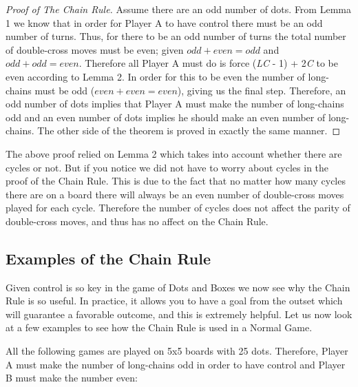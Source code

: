 \documentclass[12pt,twoside]{reedthesis}
\begin{document}
\begin{proof}[Proof of The Chain Rule]
Assume there are an odd number of dots.  From Lemma 1 we know that in order for Player A to have control there must be an odd number of turns.  Thus, for there to be an odd number of turns the total number of double-cross moves must be even; given $odd + even = odd$ and $odd + odd = even$.  Therefore all Player A must do is force  (\emph{LC} - 1) + 2\emph{C} to be even according to Lemma 2.  In order for this to be even the number of long-chains must be odd ($even + even = even$), giving us the final step.  Therefore, an odd number of dots implies that Player A must make the number of long-chains odd and an even number of dots implies he should make an even number of long-chains.  The other side of the theorem is proved in exactly the same manner.
\end{proof}

The above proof relied on Lemma 2 which takes into account whether there are cycles or not.  But if you notice we did not have to worry about cycles in the proof of the Chain Rule.  This is due to the fact that no matter how many cycles there are on a board there will always be an even number of double-cross moves played for each cycle.  Therefore the number of cycles does not affect the parity of double-cross moves, and thus has no affect on the Chain Rule.

\subsection{Examples of the Chain Rule}
Given control is so key in the game of Dots and Boxes we now see why the Chain Rule is so useful.  In practice, it allows you to have a goal from the outset which will guarantee a favorable outcome, and this is extremely helpful.  Let us now look at a few examples to see how the Chain Rule is used in a Normal Game.

All the following games are played on 5x5 boards with 25 dots.  Therefore, Player A must make the number of long-chains odd in order to have control and Player B must make the number even:
\end{document}
